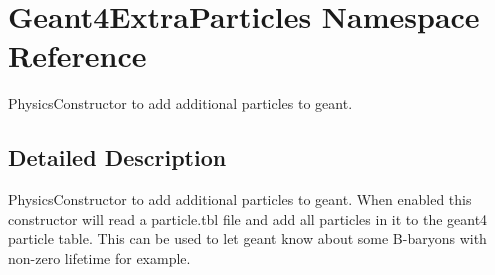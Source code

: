 \hypertarget{namespace_geant4_extra_particles}{
\section{Geant4ExtraParticles Namespace Reference}
\label{namespace_geant4_extra_particles}
}


PhysicsConstructor to add additional particles to geant.  


\subsection{Detailed Description}
PhysicsConstructor to add additional particles to geant. When enabled this constructor will read a particle.tbl file and add all particles in it to the geant4 particle table. This can be used to let geant know about some B-\/baryons with non-\/zero lifetime for example. 